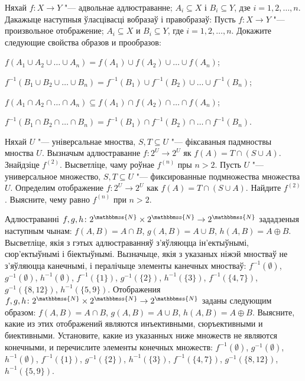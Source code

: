 




\begin{problemList}

\problemItemWithCommonPart
{Няхай $f \colon X \to Y$ "--- адвольнае адлюстраванне;
$A_i \subseteq X$ і $B_i \subseteq Y$, дзе $i = 1, 2, \ldots, n$.
Дакажыце наступныя ўласцівасці вобразаў і правобразаў:}
{Пусть $f \colon X \to Y$ "--- произвольное отображение;
$A_i \subseteq X$ и $B_i \subseteq Y$, где $i = 1, 2, \ldots, n$.
Докажите следующие свойства образов и прообразов:}
{%
\begin{belarusianEnumerate}
    \item $f(A_1 \cup A_2 \cup \ldots \cup A_n) = f(A_1) \cup f(A_2) \cup \ldots \cup f(A_n)$;
    \item $f^{-1}(B_1 \cup B_2 \cup \ldots \cup B_n) = f^{-1}(B_1) \cup f^{-1}(B_2) \cup \ldots \cup f^{-1}(B_n)$;
    \item $f(A_1 \cap A_2 \cap \ldots \cap A_n) \subseteq f(A_1) \cap f(A_2) \cap \ldots \cap f(A_n)$;
    \item $f^{-1}(B_1 \cap B_2 \cap \ldots \cap B_n) = f^{-1}(B_1) \cap f^{-1}(B_2) \cap \ldots \cap f^{-1}(B_n)$.
\end{belarusianEnumerate}
}

\smallskip

\problemItemSimple
{Няхай $U$ "--- універсальнае мноства, $S, T \subseteq U$ "--- фіксаваныя падмноствы мноства $U$.
Вызначым адлюстраванне $f \colon 2^U \to 2^U$ як $f(A) = T \cap (S \cup A)$. Знайдзіце $f^{(2)}$.
Высветліце, чаму роўнае $f^{(n)}$ пры $n > 2$.}
{Пусть $U$ "--- универсальное множество, $S, T \subseteq U$ "--- фиксированные подмножества множества $U$.
Определим отображение $f \colon 2^U \to 2^U$ как $f(A) = T \cap (S \cup A)$. Найдите $f^{(2)}$.
Выясните, чему равно $f^{(n)}$ при $n > 2$.}

\bigskip

\problemItemSimple
{%
Адлюстраванні $f, g, h \colon 2^{\mathbbmss{N}} \times 2^{\mathbbmss{N}} \to 2^{\mathbbmss{N}}$
зададзеныя наступным чынам: $f(A, B) = A \cap B$, $g(A, B) = A \cup B$, $h(A, B) = A \oplus B$.
Высветліце, якія з гэтых адлюстраванняў з'яўляюцца ін'ектыўнымі, сюр'ектыўнымі і біектыўнымі.
Вызначыце, якія з указаных ніжэй мностваў не з'яўляюцца канечнымі, і пералічыце элементы канечных мностваў:
$f^{-1}(\emptyset)$, $g^{-1}(\emptyset)$, $h^{-1}(\emptyset)$, $f^{-1}(\{1\})$,
$g^{-1}(\{2\})$, $h^{-1}(\{3\})$, $f^{-1}(\{4, 7\})$,
$g^{-1}(\{8, 12\})$, $h^{-1}(\{5, 9\})$.
}
{%
Отображения $f, g, h \colon 2^{\mathbbmss{N}} \times 2^{\mathbbmss{N}} \to 2^{\mathbbmss{N}}$
заданы следующим образом: $f(A, B) = A \cap B$, $g(A, B) = A \cup B$, $h(A, B) = A \oplus B$.
Выясните, какие из этих отображений являются инъективными, сюръективными и биективными.
Установите, какие из указанных ниже множеств не являются конечными, и перечислите элементы конечных множеств:
$f^{-1}(\emptyset)$, $g^{-1}(\emptyset)$, $h^{-1}(\emptyset)$, $f^{-1}(\{1\})$,
$g^{-1}(\{2\})$, $h^{-1}(\{3\})$, $f^{-1}(\{4, 7\})$,
$g^{-1}(\{8, 12\})$, $h^{-1}(\{5, 9\})$.
}


\end{problemList}
